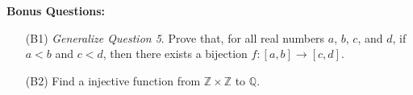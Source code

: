 \documentclass{article}
\begin{document}
\newpage
\textbf{Bonus Questions:}

\begin{itemize}
	\item [(B1)] \textit{Generalize Question 5}. Prove that, for all real numbers $a$, $b$, $c$, and $d$, if $a < b$ and $c < d$, then there exists a bijection $f : [a,b] \rightarrow [c,d]$.
	\item [(B2)] Find a injective function from $\mathbb{Z} \times \mathbb{Z}$ to $\mathbb{Q}$.
\end{itemize}
\end{document}

